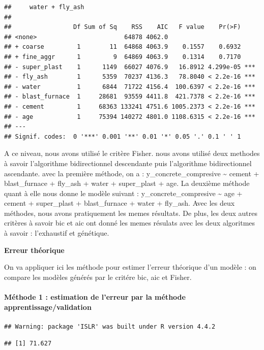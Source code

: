\documentclass[
  12pt,
]{article}
\begin{document}
\begin{verbatim}
##     water + fly_ash
## 
##                 Df Sum of Sq    RSS    AIC   F value    Pr(>F)    
## <none>                        64878 4062.0                        
## + coarse         1        11  64868 4063.9    0.1557    0.6932    
## + fine_aggr      1         9  64869 4063.9    0.1314    0.7170    
## - super_plast    1      1149  66027 4076.9   16.8912 4.299e-05 ***
## - fly_ash        1      5359  70237 4136.3   78.8040 < 2.2e-16 ***
## - water          1      6844  71722 4156.4  100.6397 < 2.2e-16 ***
## - blast_furnace  1     28681  93559 4411.8  421.7378 < 2.2e-16 ***
## - cement         1     68363 133241 4751.6 1005.2373 < 2.2e-16 ***
## - age            1     75394 140272 4801.0 1108.6315 < 2.2e-16 ***
## ---
## Signif. codes:  0 '***' 0.001 '**' 0.01 '*' 0.05 '.' 0.1 ' ' 1
\end{verbatim}

A ce niveau, nous avons utilisé le critère Fisher. nous avons utilisé
deux methodes à savoir l'algorithme bidirectionnel descendante puis
l'algorithme bidirectionnel ascendante. avec la première méthode, on a :
y\_concrete\_compresive \textasciitilde{} cement + blast\_furnace +
fly\_ash + water + super\_plast + age. La deuxième méthode quant à elle
nous donne le modèle suivant : y\_concrete\_compresive \textasciitilde{}
age + cement + super\_plast + blast\_furnace + water + fly\_ash. Avec
les deux méthodes, nous avons pratiquement les memes résultats. De plus,
les deux autres critères à savoir bic et aic ont donné les memes
résulats avec les deux algoritmes à savoir : l'exhaustif et génétique.

\textbf{Erreur théorique}

On va appliquer ici les méthode pour estimer l'erreur théorique d'un
modèle : on compare les modèles générés par le critére bic, aic et
Fisher.

\paragraph{Méthode 1 : estimation de l'erreur par la méthode
apprentissage/validation}\label{muxe9thode-1-estimation-de-lerreur-par-la-muxe9thode-apprentissagevalidation}

\begin{verbatim}
## Warning: package 'ISLR' was built under R version 4.4.2
\end{verbatim}

\begin{verbatim}
## [1] 71.627
\end{verbatim}
\end{document}
